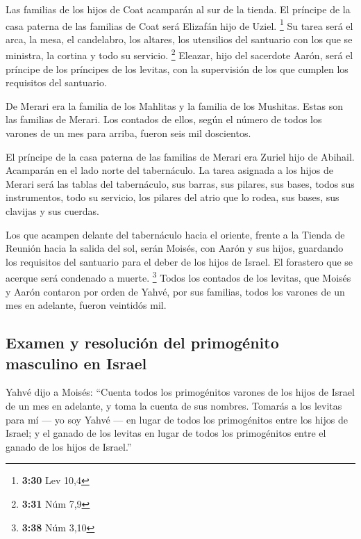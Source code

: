\begin{paracol}{2}
 Las familias de los hijos de Coat acamparán al sur de la
tienda.  El príncipe de la casa paterna de las familias
de Coat será Elizafán hijo de Uziel. \footnote{\textbf{3:30} Lev 10,4}
 Su tarea será el arca, la mesa, el candelabro, los
altares, los utensilios del santuario con los que se ministra, la
cortina y todo su servicio. \footnote{\textbf{3:31} Núm 7,9}
 Eleazar, hijo del sacerdote Aarón, será el príncipe de
los príncipes de los levitas, con la supervisión de los que cumplen los
requisitos del santuario.

 De Merari era la familia de los Mahlitas y la familia de
los Mushitas. Estas son las familias de Merari.  Los
contados de ellos, según el número de todos los varones de un mes para
arriba, fueron seis mil doscientos.

 El príncipe de la casa paterna de las familias de Merari
era Zuriel hijo de Abihail. Acamparán en el lado norte del tabernáculo.
 La tarea asignada a los hijos de Merari será las tablas
del tabernáculo, sus barras, sus pilares, sus bases, todos sus
instrumentos, todo su servicio,  los pilares del atrio
que lo rodea, sus bases, sus clavijas y sus cuerdas.

 Los que acampen delante del tabernáculo hacia el
oriente, frente a la Tienda de Reunión hacia la salida del sol, serán
Moisés, con Aarón y sus hijos, guardando los requisitos del santuario
para el deber de los hijos de Israel. El forastero que se acerque será
condenado a muerte. \footnote{\textbf{3:38} Núm 3,10} 
Todos los contados de los levitas, que Moisés y Aarón contaron por orden
de Yahvé, por sus familias, todos los varones de un mes en adelante,
fueron veintidós mil.

\hypertarget{examen-y-resoluciuxf3n-del-primoguxe9nito-masculino-en-israel}{%
\subsection{Examen y resolución del primogénito masculino en
Israel}\label{examen-y-resoluciuxf3n-del-primoguxe9nito-masculino-en-israel}}

 Yahvé dijo a Moisés: ``Cuenta todos los primogénitos
varones de los hijos de Israel de un mes en adelante, y toma la cuenta
de sus nombres.  Tomarás a los levitas para mí --- yo soy
Yahvé --- en lugar de todos los primogénitos entre los hijos de Israel;
y el ganado de los levitas en lugar de todos los primogénitos entre el
ganado de los hijos de Israel.''


\end{paracol}
